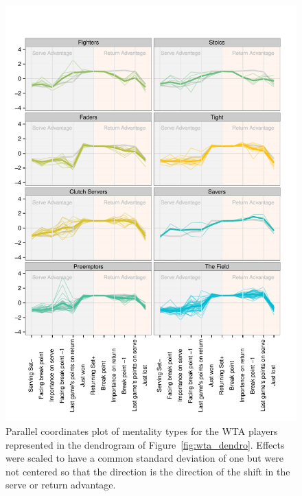 \documentclass{Latex/svjour3}
\begin{document}
\begin{figure}
\includegraphics[scale=0.9]{figs/wta_coords_std_fixed.pdf}
\caption{Parallel coordinates plot of mentality types for the WTA players
  represented in the dendrogram of Figure~\ref{fig:wta_dendro}. Effects were
  scaled to have a common standard deviation of one but were not centered so
  that the direction is the direction of the shift in the serve or return
  advantage.}
\label{fig:wta_coord}
\end{figure}

\clearpage
\end{document}
